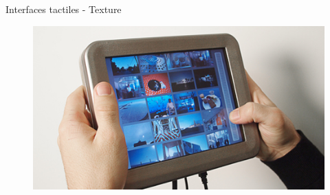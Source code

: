 \documentclass[compress, noflama]{beamer}
\begin{document}
{
\begin{frame}{Interfaces tactiles - Texture}
\begin{figure}
\href{run:videos/TeslaTouch.mov}{\includegraphics[width=\linewidth]{images/teslatouch-03}}
\end{figure}
\end{frame}
}
\end{document}
